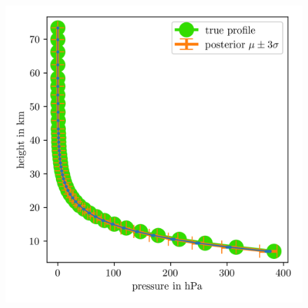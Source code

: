 \begin{figure}[ht!]
	\centering
	\includegraphics{PressPostMeanSigm.png}
	\caption[]{}
	\label{fig:}
\end{figure}



